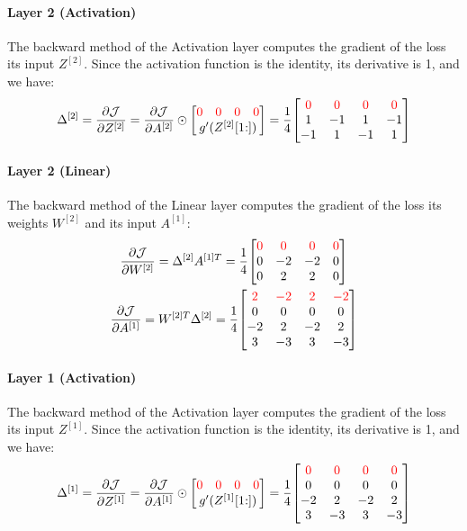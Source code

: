 \paragraph{Layer 2 (Activation)} The backward method of the Activation layer computes the gradient of the loss \wrt its input $Z^{[2]}$. Since the activation function is the identity, its derivative is 1, and we have:
\begin{equation*}
    \Delta^{[2]} = \pdv{\J}{Z^{[2]}} = \pdv{\J}{A^{[2]}} \odot \mqty[
        \mqty{\color{red} 0 & \color{red} 0 & \color{red} 0 & \color{red} 0} \\
        g'(Z^{[2]}[1\hspace{-0.6ex}:])
    ] = \frac{1}{4} \mqty[
        \color{red} 0 & \color{red} 0 & \color{red} 0 & \color{red} 0 \\
        1 & -1 & 1 & -1 \\
        -1 & 1 & -1 & 1
    ]
\end{equation*}

\paragraph{Layer 2 (Linear)} The backward method of the Linear layer computes the gradient of the loss \wrt its weights $W^{[2]}$ and its input $A^{[1]}$:
\begin{gather*}
    \pdv{\J}{W^{[2]}} = \Delta^{[2]} A^{[1]T} = \frac{1}{4} \mqty[
        \color{red} 0 & \color{red} 0 & \color{red} 0 & \color{red} 0 \\
        0 & -2 & -2 & 0 \\
        0 & 2 & 2 & 0 \\
    ]\\
    \pdv{\J}{A^{[1]}} = W^{[2]T} \Delta^{[2]} = \frac{1}{4} \mqty[
        \color{red} 2 & \color{red} -2 & \color{red} 2 & \color{red} -2 \\
        0 & 0 & 0 & 0 \\
        -2 & 2 & -2 & 2 \\
        3 & -3 & 3 & -3 \\
    ]
\end{gather*}

\paragraph{Layer 1 (Activation)} The backward method of the Activation layer computes the gradient of the loss \wrt its input $Z^{[1]}$. Since the activation function is the identity, its derivative is 1, and we have:
\begin{equation*}
    \Delta^{[1]} = \pdv{\J}{Z^{[1]}} = \pdv{\J}{A^{[1]}} \odot \mqty[
        \mqty{\color{red} 0 & \color{red} 0 & \color{red} 0 & \color{red} 0} \\
        g'(Z^{[1]}[1\hspace{-0.6ex}:])
    ] = \frac{1}{4} \mqty[
        \color{red} 0 & \color{red} 0 & \color{red} 0 & \color{red} 0 \\
        0 & 0 & 0 & 0 \\
        -2 & 2 & -2 & 2 \\
        3 & -3 & 3 & -3 \\
    ]
\end{equation*}

